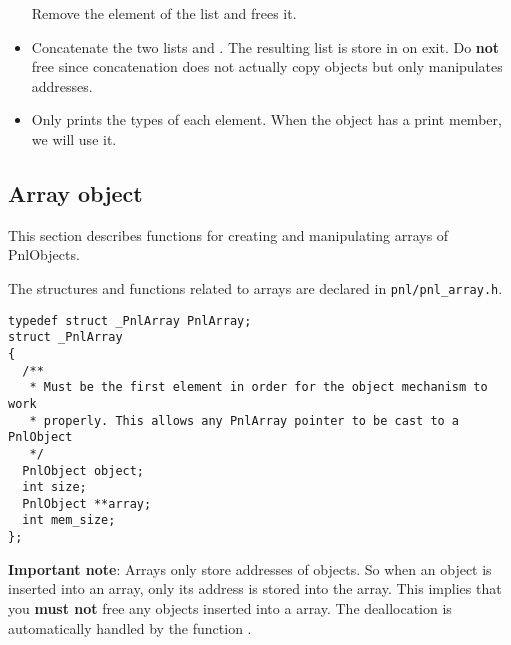 \begin{itemize}
  \sshortdescribe Remove the  element of the list  and frees it.
\item {}
  \sshortdescribe Concatenate the two lists  and . The
  resulting list is store in  on exit. Do {\bf not} free 
  since concatenation does not actually copy objects but only manipulates
  addresses.
\item {}
  \sshortdescribe Only prints the types of each element. When  the
  \PnlObject object has a print member, we will use it.
\end{itemize}

\subsection{Array object}

This section describes functions for creating and manipulating arrays of
PnlObjects.

The structures and functions related to arrays are declared in
\verb!pnl/pnl_array.h!.

\begin{verbatim}
typedef struct _PnlArray PnlArray;
struct _PnlArray
{
  /**
   * Must be the first element in order for the object mechanism to work
   * properly. This allows any PnlArray pointer to be cast to a PnlObject
   */
  PnlObject object; 
  int size;
  PnlObject **array;
  int mem_size;
};
\end{verbatim}

\textbf{Important note}: Arrays only store addresses of objects. So when an
object is inserted into an array, only its address is stored into the array. This
implies that you \textbf{must not} free any objects inserted into a array. The
deallocation is automatically handled by the function .

